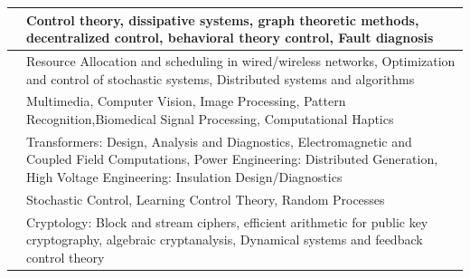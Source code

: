 \documentclass[openany]{book} %
\begin{document}
\begin{tabular}{p{4.5cm} p{9cm}}

\hline

\href{https://www.ee.iitb.ac.in/wiki/faculty/belur}{\color{blue}{Prof. Madhu N. Belur}} & Control theory, dissipative systems, graph theoretic methods, decentralized control, behavioral theory control, Fault diagnosis \\
\hline 

\href{https://www.ee.iitb.ac.in/wiki/faculty/chaporkar}{\color{blue}{Prof. Prasanna Chaporkar }} & Resource Allocation and scheduling in wired/wireless networks, Optimization and control of stochastic systems, Distributed systems and algorithms \\ 
\hline 

\href{https://www.ee.iitb.ac.in/~sc/}{\color{blue}{Prof. Subhasis Chaudhuri }} & Multimedia, Computer Vision, Image Processing, Pattern Recognition,Biomedical Signal Processing, Computational Haptics \\ 
\hline 

\href{https://www.ee.iitb.ac.in/wiki/faculty/svk}{\color{blue}{Prof. Shrikrishna V. Kulkarni}} & Transformers: Design, Analysis and Diagnostics, Electromagnetic and Coupled Field Computations, Power Engineering: Distributed Generation, High Voltage Engineering: Insulation Design/Diagnostics \\ 
\hline 


\href{https://www.ee.iitb.ac.in/web/faculty/homepage/borkar}{\color{blue}{Prof. Vivek Shripad Borkar }} & Stochastic Control, Learning Control Theory, Random Processes \\ 
\hline 

\href{https://www.ee.iitb.ac.in/wiki/faculty/vrs}{\color{blue}{Prof. Virendra R. Sule }} & Cryptology: Block and stream ciphers, efficient arithmetic for public key cryptography, algebraic cryptanalysis, Dynamical systems and feedback control theory \\ 
\hline

\end{tabular}
\end{document}
